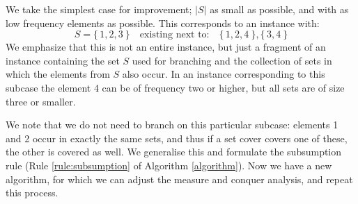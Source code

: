 \documentclass[fleqn]{stacs_proc}
\begin{document}
We take the simplest case for improvement; $|S|$ as small as possible,
and with as low frequency elements as possible.
This corresponds to an instance with:
\[ S = \{ \, 1,2,3 \: \} \quad \textrm{existing next to:} \quad \{ \, 1,2,4 \: \}, \{ \, 3,4 \: \}\]
We emphasize that this is not an entire instance, but just a fragment of an instance containing the set $S$ used for branching 
and the collection of sets in which the elements from $S$ also occur.
In an instance corresponding to this subcase the element 4 can be of frequency two or higher, but all sets are of size three or smaller.

We note that we do not need to branch on this particular subcase:
elements 1 and 2 occur in exactly the same sets, and thus
if a set cover covers one of these, the other is covered as well.
We generalise this and formulate the subsumption rule (Rule
\ref{rule:subsumption} of Algorithm \ref{algorithm}).
Now we have a new algorithm, for which we can adjust the measure and conquer analysis, and repeat this process.
\end{document}
